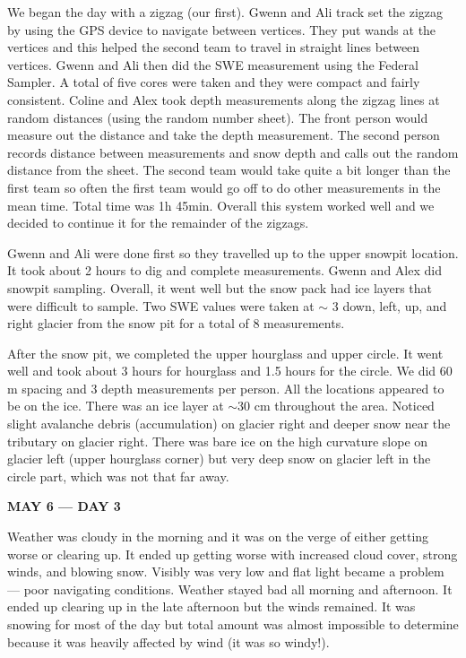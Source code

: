 \documentclass[12pt]{article}
\begin{document}
We began the day with a zigzag (our first). Gwenn and Ali track set the zigzag by using the GPS device to navigate between vertices. They put wands at the vertices and this helped the second team to travel in straight lines between vertices. Gwenn and Ali then did the SWE measurement using the Federal Sampler. A total of five cores were taken and they were compact and fairly consistent. Coline and Alex took depth measurements along the zigzag lines at random distances (using the random number sheet). The front person would measure out the distance and take the depth measurement. The second person records distance between measurements and snow depth and calls out the random distance from the sheet. The second team would take quite a bit longer than the first team so often the first team would go off to do other measurements in the mean time. Total time was 1h 45min. Overall this system worked well and we decided to continue it for the remainder of the zigzags.  

Gwenn and Ali were done first so they travelled up to the upper snowpit location. It took about 2 hours to dig and complete measurements. Gwenn and Alex did snowpit sampling. Overall, it went well but the snow pack had ice layers that were difficult to sample. Two SWE values were taken at $\sim$ 3 down, left, up, and right glacier from the snow pit for a total of 8 measurements. 

After the snow pit, we completed the upper hourglass and upper circle. It went well and took about 3 hours for hourglass and 1.5 hours for the circle. We did 60 m spacing and 3 depth measurements per person. All the locations appeared to be on the ice. There was an ice layer at $\sim$30 cm throughout the area. Noticed slight avalanche debris (accumulation) on glacier right and deeper snow near the tributary on glacier right. There was bare ice on the high curvature slope on glacier left (upper hourglass corner) but very deep snow on glacier left in the circle part, which was not that far away. 

\vspace{4mm}
\noindent \textbf{MAY 6 --- DAY 3}

Weather was cloudy in the morning and it was on the verge of either getting worse or clearing up. It ended up getting worse with increased cloud cover, strong winds, and blowing snow. Visibly was very low and flat light became a problem --- poor navigating conditions. Weather stayed bad all morning and afternoon. It ended up clearing up in the late afternoon but the winds remained. It was snowing for most of the day but total amount was almost impossible to determine because it was heavily affected by wind (it was so windy!). 
\end{document}
